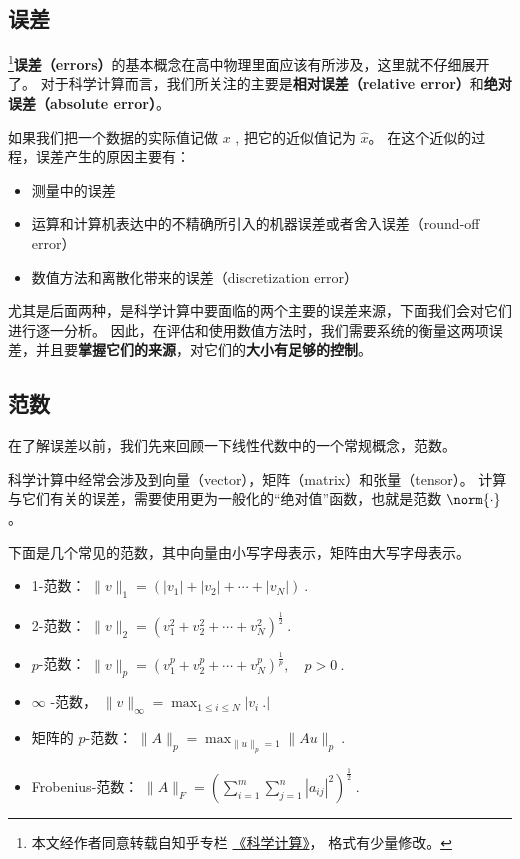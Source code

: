 

\subsection{误差}
\footnote{本文经作者同意转载自知乎专栏 \href{https://www.zhihu.com/column/c_1226443594048942080}{《科学计算》}， 格式有少量修改。}\textbf{误差（errors）}的基本概念在高中物理里面应该有所涉及，这里就不仔细展开了。 对于科学计算而言，我们所关注的主要是\textbf{相对误差（relative error）}和\textbf{绝对误差（absolute error）}。

如果我们把一个数据的实际值记做 $x$ , 把它的近似值记为 $\hat x$。 在这个近似的过程，误差产生的原因主要有：
\begin{itemize}
\item 测量中的误差
\item 运算和计算机表达中的不精确所引入的机器误差或者舍入误差（round-off error）
\item 数值方法和离散化带来的误差（discretization error）
\end{itemize}
尤其是后面两种，是科学计算中要面临的两个主要的误差来源，下面我们会对它们进行逐一分析。 因此，在评估和使用数值方法时，我们需要系统的衡量这两项误差，并且要\textbf{掌握它们的来源}，对它们的\textbf{大小有足够的控制}。

\subsection{范数}
在了解误差以前，我们先来回顾一下线性代数中的一个常规概念，范数。

科学计算中经常会涉及到向量（vector），矩阵（matrix）和张量（tensor）。 计算与它们有关的误差，需要使用更为一般化的“绝对值”函数，也就是范数 $\norm{\cdot}$。

下面是几个常见的范数，其中向量由小写字母表示，矩阵由大写字母表示。
\begin{itemize}
\item 1-范数：  $\|v\|_1=(|v_1|+|v_2|+\cdots+|v_N|)~.$
\item 2-范数：  $\|v\|_2=(v_1^2+v_2^2+\cdots+v_N^2)^{\frac{1}{2}}~.$
\item $p$-范数：  $\|v\|_p=(v_1^p+v_2^p+\cdots+v_N^p)^{\frac{1}{p}},\quad p>0~.$
\item $\infty$  -范数，  $\|v\|_{\infty}=\max_{1\le i \le N}|v_i~.|$
\item 矩阵的 $p$-范数：  $\|A\|_p=\max_{\|u\|_p=1}\|Au\|_p~.$
\item Frobenius-范数：  $\|A\|_F=(\sum_{i=1}^m\sum_{j=1}^n|a_{ij}|^2)^{\frac{1}{2}}~.$
\end{itemize}

